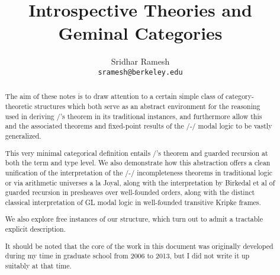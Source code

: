 \documentclass[12pt]{article}
\title{Introspective Theories and Geminal Categories}
\author{
  Sridhar Ramesh\\
  \texttt{sramesh@berkeley.edu}
}
\begin{document}
\maketitle

\begin{abstract}

The aim of these notes is to draw attention to a certain simple class of category-theoretic structures which both serve as an abstract environment for the reasoning used in deriving \Loeb/'s theorem in its traditional instances, and furthermore allow this and the associated theorems and fixed-point results of the \Goedel/-\Loeb/ modal logic to be vastly generalized.

This very minimal categorical definition entails \Loeb/'s theorem and guarded recursion at both the term and type level. We also demonstrate how this abstraction offers a clean unification of the interpretation of the \Godel/-\Lob/ incompleteness theorems in traditional logic or via arithmetic universes a la Joyal, along with the interpretation by Birkedal et al of guarded recursion in presheaves over well-founded orders, along with the distinct classical interpretation of GL modal logic in well-founded transitive Kripke frames.

We also explore free instances of our structure, which turn out to admit a tractable explicit description.

It should be noted that the core of the work in this document was originally developed during my time in graduate school from 2006 to 2013, but I did not write it up suitably at that time.
\end{abstract}

\newpage
\tableofcontents

\newpage
\setcounter{section}{-1}
\setcounter{page}{1}








\end{document}
